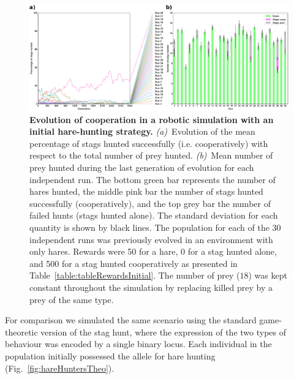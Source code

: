     \begin{figure}[h]
      \centerfloat
        \includegraphics[scale = 0.90]{fig/ArticleBio1/Fig3.eps}
      \caption{\textbf{Evolution of cooperation in a robotic simulation with an initial hare-hunting strategy.} 
      {\em (a)}~Evolution of the mean percentage of stags hunted successfully (i.e. cooperatively) with respect to the total number of prey hunted. {\em (b)}~Mean number of prey hunted during the last generation of evolution for each independent run. The bottom green bar represents the number of hares hunted, the middle pink bar the number of stags hunted successfully (cooperatively), and the top grey bar the number of failed hunts (stags hunted alone). The standard deviation for each quantity is shown by black lines. The population for each of the 30 independent runs was previously evolved in an environment with only hares. Rewards were 50 for a hare, 0 for a stag hunted alone, and 500 for a stag hunted cooperatively as presented in Table~\ref{table:tableRewardsInitial}. The number of prey ($18$) was kept constant throughout the simulation by replacing killed prey by a prey of the same type.}
      \label{fig:hareHuntersRob}
    \end{figure}

    For comparison we simulated the same scenario using the standard game-theoretic version of the stag hunt, where the expression of the two types of behaviour was encoded by a single binary locus. Each individual in the population initially possessed the allele for hare hunting (Fig.~\ref{fig:hareHuntersTheo}).

